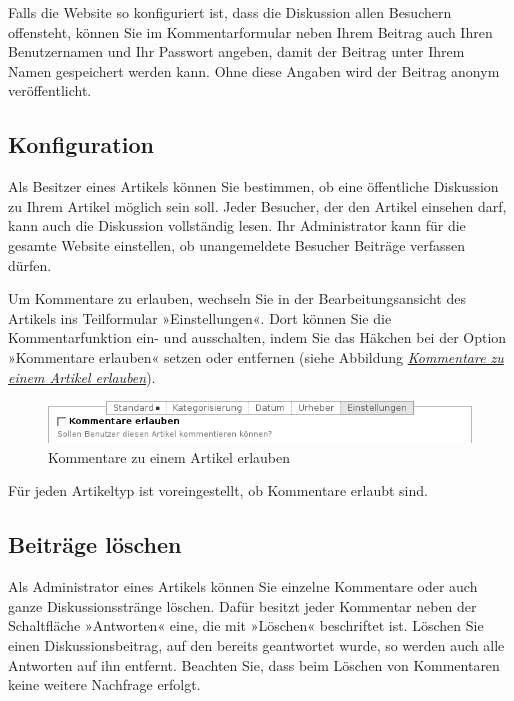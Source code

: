 \documentclass[a4paper,12pt,ngerman]{manual}
\begin{document}
Falls die Website so konfiguriert ist, dass die Diskussion allen Besuchern
offensteht, können Sie im Kommentarformular neben Ihrem Beitrag auch Ihren
Benutzernamen und Ihr Passwort angeben, damit der Beitrag unter Ihrem Namen
gespeichert werden kann. Ohne diese Angaben wird der Beitrag anonym
veröffentlicht.


\subsection{Konfiguration}

Als Besitzer eines Artikels können Sie bestimmen, ob eine öffentliche
Diskussion zu Ihrem Artikel möglich sein soll. Jeder Besucher, der den
Artikel einsehen darf, kann auch die Diskussion vollständig lesen. Ihr
Administrator kann für die gesamte Website einstellen, ob
unangemeldete Besucher Beiträge verfassen dürfen.

Um Kommentare zu erlauben, wechseln Sie in der Bearbeitungsansicht des
Artikels ins Teilformular »Einstellungen«. Dort können Sie die
Kommentarfunktion ein- und ausschalten, indem Sie das Häkchen bei der Option
»Kommentare erlauben« setzen oder entfernen (siehe
Abbildung \hyperlink{fig-allow-discussion}{\emph{Kommentare zu einem Artikel erlauben}}).
\hypertarget{fig-allow-discussion}{}\begin{figure}[htbp]
\centering

\includegraphics{allow-discussion.png}
\caption{Kommentare zu einem Artikel erlauben}\end{figure}

Für jeden Artikeltyp ist voreingestellt, ob Kommentare erlaubt sind.


\subsection{Beiträge löschen}

Als Administrator eines Artikels können Sie einzelne Kommentare oder auch
ganze Diskussionsstränge löschen. Dafür besitzt jeder Kommentar neben der
Schaltfläche »Antworten« eine, die mit »Löschen« beschriftet ist. Löschen Sie
einen Diskussionsbeitrag, auf den bereits geantwortet wurde, so werden auch
alle Antworten auf ihn entfernt. Beachten Sie, dass beim Löschen von
Kommentaren keine weitere Nachfrage erfolgt.
\end{document}
